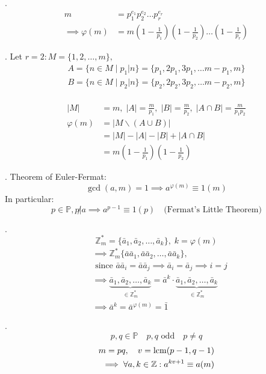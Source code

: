 \Theorem.
\begin{align*}
  m &= p_1^{e_1} p_2^{e_2} \ldots p_r^{e_r} \\
  \implies \varphi(m) &= m \left( 1-\frac{1}{p_1} \right) \left( 1-\frac{1}{p_2} \right) \ldots \left( 1-\frac{1}{p_r} \right)
\end{align*}

\Proof.
Let $r=2: M = \{1,2, \ldots, m\},$
\begin{align*}
  A = \{ n \in M \mid p_1|n\} = \{p_1, 2p_1, 3p_1, \ldots m-p_1, m\} \\
  B = \{ n \in M \mid p_2|n\} = \{p_2, 2p_2, 3p_2, \ldots m-p_2, m\} \\
\end{align*}

\begin{align*}
  |M| &= m, \; |A| = \frac{m}{p_1}, \; |B| = \frac{m}{p_2}, \;
    |A \cap B| = \frac{m}{p_1p_2}\\
  \varphi(m)
    &= | M \backslash(A\cup B) | \\
    &= |M| - |A| - |B| + | A \cap B|\\
    &= m \left(1- \frac{1}{p_1} \right) \left(1- \frac{1}{p_2} \right)
\end{align*}

\Theorem.
Theorem of Euler-Fermat:
\[
  \gcd(a,m) = 1 \implies a ^{\varphi(m)} \equiv 1 (m)
\]
In particular:
\[
  p \in \mathbb{P}, p \not| a \implies a^{p-1} \equiv 1 (p) \quad
  \text{(Fermat's Little Theorem)}
\]

\Proof.
\[
  \mathbb{Z}_m^{*} = \{\bar{a}_1, \bar{a}_2, \ldots, \bar{a}_k \}, \;k = \varphi(m)
\]
\begin{align*}
  &\implies \mathbb{Z}_m^{*} \{\bar{a}\bar{a}_1, \bar{a}\bar{a}_2, \ldots, \bar{a}\bar{a}_k \}, \\
  &\text{ since } \bar{a}\bar{a}_i = \bar{a}\bar{a}_j
    \implies \bar{a}_i = \bar{a}_j \implies i = j \\
  &\implies \underbrace{\bar{a}_1, \bar{a}_2, \ldots, \bar{a}_k}_
        {\in \mathbb{Z}_m^{*}}
      = \bar{a}^k \cdot \underbrace{\bar{a}_1, \bar{a}_2, \ldots, \bar{a}_k}_
        {\in \mathbb{Z}_m^{*}} \\
  &\implies \bar{a}^k = \bar{a}^{\varphi(m)} = \bar{1}
\end{align*}

\Theorem.
\[
  p, q \in \mathbb{P} \quad p,q \text{ odd} \quad p \neq q
\]
\begin{align*}
  m = pq, \quad v = \operatorname{lcm}(p-1, q-1) \\
  \implies \forall a,k \in \mathbb{Z}: a^{kv + 1} \equiv a(m)
\end{align*}

